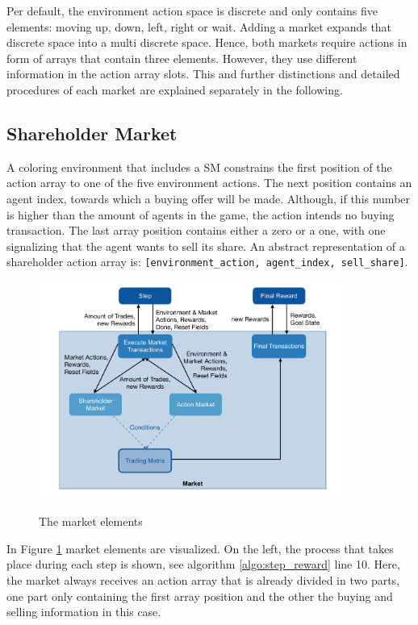 Per default, the environment action space is discrete and only contains five elements: moving up, down, left, right or wait. Adding a market expands that discrete space into a multi discrete space. Hence, both markets require actions in form of arrays that contain three elements. However, they use different information in the action array slots. This and further distinctions and detailed procedures of each market are explained separately in the following.

\subsection{Shareholder Market}
A coloring environment that includes a SM constrains the first position of the action array to one of the five environment actions. The next position contains an agent index, towards which a buying offer will be made. Although, if this number is higher than the amount of agents in the game, the action intends no buying transaction. The last array position contains either a zero or a one, with one signalizing that the agent wants to sell its share. An abstract representation of a shareholder action array is: \verb|[environment_action, agent_index, sell_share]|.

\begin{figure}[hpbt]
    \centering
    \includegraphics[width=0.9\textwidth]{pictures/market}\\
    \caption[Market Elements]{The market elements}\label{fig:market}
\end{figure}

In Figure \ref{fig:market} market elements are visualized. On the left, the process that takes place during each step is shown, see algorithm \ref{algo:step_reward} line 10. Here, the market always receives an action array that is already divided in two parts, one part only containing the first array position and the other the buying and selling information in this case.

